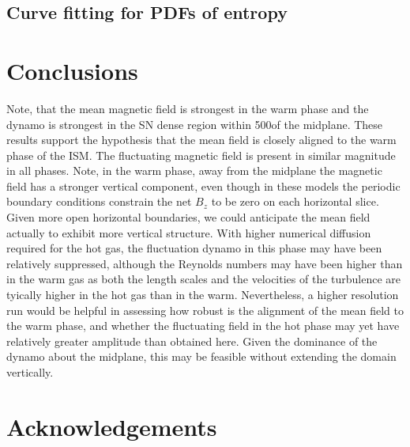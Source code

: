 \documentclass[useAMS,usenatbib]{mn2e}
\begin{document}
\subsection{Curve fitting for PDFs of entropy}

 
\section{Conclusions}
Note, that the mean magnetic field is strongest in the warm phase and the 
dynamo is strongest in the SN dense region within 500\pc of the midplane. 
These results support the hypothesis that the mean field is closely aligned to 
the warm phase of the ISM.
The fluctuating magnetic field is present in similar magnitude in all phases.
Note, in the warm phase, away from the midplane the magnetic field has a 
stronger vertical component, even though in these models the periodic boundary
conditions constrain the net $B_z$ to be zero on each horizontal slice. 
Given more open horizontal boundaries, we could anticipate the mean field 
actually to exhibit more vertical structure. 
With higher numerical diffusion required for the hot gas, the fluctuation 
dynamo in this phase may have been relatively suppressed, although the 
Reynolds numbers may have been higher than in the warm gas as both the length
scales and the velocities of the turbulence are tyically higher in the hot gas
than in the warm.
Nevertheless, a higher resolution run would be helpful in assessing how robust
is the alignment of the mean field to the warm phase, and whether the
fluctuating field in the hot phase may yet have relatively greater amplitude
than obtained here.
Given the dominance of the dynamo about the midplane, this may be feasible
without extending the domain vertically.


\newpage
\section*{Acknowledgements}
\end{document}
